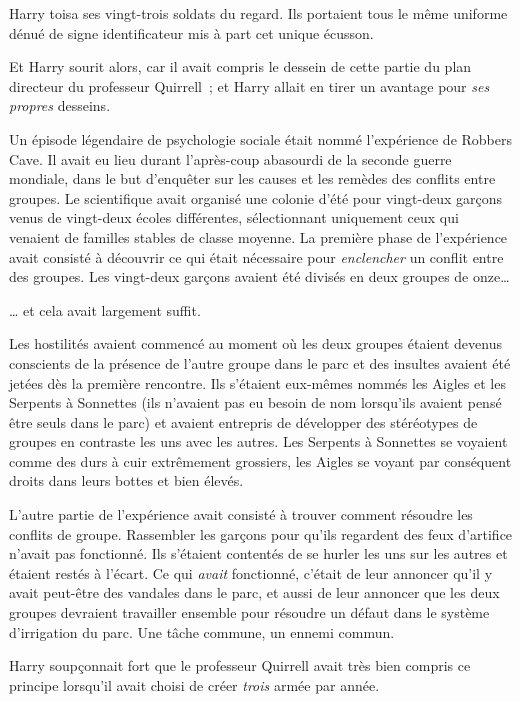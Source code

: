 Harry toisa ses vingt-trois soldats du regard. Ils portaient tous le même uniforme dénué de signe identificateur mis à part cet unique écusson.

Et Harry sourit alors, car il avait compris le dessein de cette partie du plan directeur du professeur Quirrell~; et Harry allait en tirer un avantage pour \emph{ses propres} desseins.

Un épisode légendaire de psychologie sociale était nommé l'expérience de Robbers Cave. Il avait eu lieu durant l'après-coup abasourdi de la seconde guerre mondiale, dans le but d'enquêter sur les causes et les remèdes des conflits entre groupes. Le scientifique avait organisé une colonie d'été pour vingt-deux garçons venus de vingt-deux écoles différentes, sélectionnant uniquement ceux qui venaient de familles stables de classe moyenne. La première phase de l'expérience avait consisté à découvrir ce qui était nécessaire pour \emph{enclencher} un conflit entre des groupes. Les vingt-deux garçons avaient été divisés en deux groupes de onze…

… et cela avait largement suffit.

Les hostilités avaient commencé au moment où les deux groupes étaient devenus conscients de la présence de l'autre groupe dans le parc et des insultes avaient été jetées dès la première rencontre. Ils s'étaient eux-mêmes nommés les Aigles et les Serpents à Sonnettes (ils n'avaient pas eu besoin de nom lorsqu'ils avaient pensé être seuls dans le parc) et avaient entrepris de développer des stéréotypes de groupes en contraste les uns avec les autres. Les Serpents à Sonnettes se voyaient comme des durs à cuir extrêmement grossiers, les Aigles se voyant par conséquent droits dans leurs bottes et bien élevés.

L'autre partie de l'expérience avait consisté à trouver comment résoudre les conflits de groupe. Rassembler les garçons pour qu'ils regardent des feux d'artifice n'avait pas fonctionné. Ils s'étaient contentés de se hurler les uns sur les autres et étaient restés à l'écart. Ce qui \emph{avait} fonctionné, c'était de leur annoncer qu'il y avait peut-être des vandales dans le parc, et aussi de leur annoncer que les deux groupes devraient travailler ensemble pour résoudre un défaut dans le système d'irrigation du parc. Une tâche commune, un ennemi commun.

Harry soupçonnait fort que le professeur Quirrell avait très bien compris ce principe lorsqu'il avait choisi de créer \emph{trois} armée par année.

